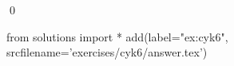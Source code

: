 
\begin{ex} 
  \label{ex:cyk6}
  
  \qed
\end{ex} 
\begin{python0}
from solutions import *
add(label="ex:cyk6",
    srcfilename='exercises/cyk6/answer.tex') 
\end{python0}
